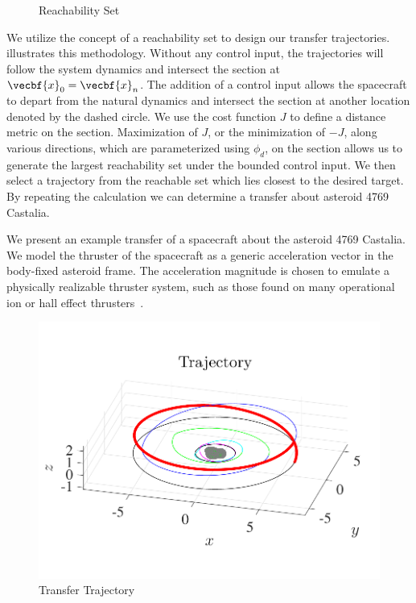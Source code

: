 \documentclass[11pt,reqno]{amsart} %
\begin{document}
\begin{multicols}{2}
\begin{figure}[H]
\begin{scaletikzpicturetowidth}{0.2\columnwidth}
\end{scaletikzpicturetowidth}
\caption{Reachability Set\label{fig:reachability_set}}
\end{figure}
We utilize the concept of a reachability set to design our transfer trajectories.
 illustrates this methodology.
Without any control input, the trajectories will follow the system dynamics and intersect the \Poincare section at \( \vecbf{x}_0 = \vecbf{x}_n\).
The addition of a control input allows the spacecraft to depart from the natural dynamics and intersect the section at another location denoted by the dashed circle.
We use the cost function \( J \) to define a distance metric on the \Poincare section.
Maximization of \( J \), or the minimization of \( -J \), along various directions, which are parameterized using \( \phi_d \), on the \Poincare section allows us to generate the largest reachability set under the bounded control input.
We then select a trajectory from the reachable set which lies closest to the desired target. 
By repeating the calculation we can determine a transfer about asteroid 4769 Castalia.

We present an example transfer of a spacecraft about the asteroid 4769 Castalia.  
We model the thruster of the spacecraft as a generic acceleration vector in the body-fixed asteroid frame. 
The acceleration magnitude is chosen to emulate a physically realizable thruster system, such as those found on many operational ion or hall effect thrusters~\cite{goebel2008,choueiri2009}.
\begin{figure}[H]
    \includegraphics[width=\columnwidth,height=\columnwidth,keepaspectratio]{figures/trajectory_3d.pdf} 
    \caption{Transfer Trajectory}
    \label{fig:transfer_3d} 
\end{figure}


\end{multicols}
\end{document}
